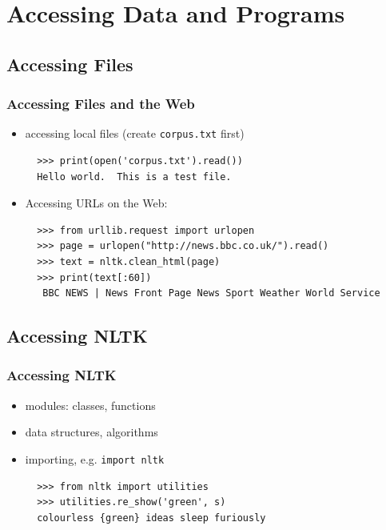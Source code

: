 \documentclass{beamer}             %
\begin{document}
\section{Accessing Data and Programs}

\subsection{Accessing Files}

\begin{frame}[fragile]
\frametitle{Accessing Files and the Web}
\begin{itemize}
\item accessing local files (create \texttt{corpus.txt} first)

{\small
\begin{verbatim}
  >>> print(open('corpus.txt').read())
  Hello world.  This is a test file.
\end{verbatim}}

\item Accessing URLs on the Web:

{\small
\begin{verbatim}
  >>> from urllib.request import urlopen
  >>> page = urlopen("http://news.bbc.co.uk/").read()
  >>> text = nltk.clean_html(page)
  >>> print(text[:60])
   BBC NEWS | News Front Page News Sport Weather World Service
\end{verbatim}}
\end{itemize}
\end{frame}

\subsection{Accessing NLTK}

\begin{frame}[fragile]
\frametitle{Accessing NLTK}

\begin{itemize}
\item modules: classes, functions
\item data structures, algorithms
\item importing, e.g. \texttt{import nltk}

{\small
\begin{verbatim}
  >>> from nltk import utilities
  >>> utilities.re_show('green', s)
  colourless {green} ideas sleep furiously
\end{verbatim}}
\end{itemize}
\end{frame}
\end{document}
